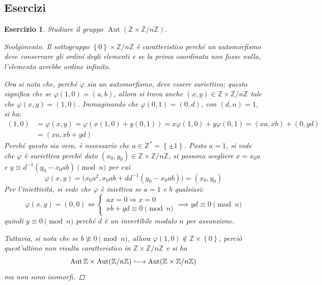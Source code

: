 \documentclass[12pt]{scrartcl}
\theoremstyle{style}
\newtheorem{esercizio}{Esercizio}[section]
\newenvironment{svolgimento}{\renewcommand\qedsymbol{$\blacksquare$}\begin{proof}[Svolgimento]}{\end{proof}}
\numberwithin{equation}{subsection}
\newcommand{\longhookrightarrow}{\lhook\joinrel\longrightarrow}
\begin{document}
\subsection{Esercizi}
\begin{esercizio}
Studiare il gruppo $\operatorname{Aut} ( \mathbb{Z}\times \mathbb{Z}/n\mathbb{Z})$.
\begin{svolgimento}
	Il sottogruppo $\left\{ 0 \right\} \times \mathbb{Z}/n\mathbb{Z}$ \`e caratteristico perch\'e un automorfismo deve conservare gli ordini degli elementi e se la prima coordinata non fosse nulla, l'elemento avrebbe ordine infinito.

	Ora si nota che, perch\'e $\varphi $ sia un automorfismo, deve essere suriettivo; questo significa che se $\varphi (1,0) = (a,b)$, allora si trova anche $(x,y) \in \mathbb{Z}\times \mathbb{Z}/n\mathbb{Z}$ tale che $\varphi (x,y) = (1,0)$. Immaginando che $\varphi (0,1) = (0,d)$, con $(d,n) = 1$, si ha:
	\[
		\begin{split}
			(1,0) &= \varphi (x,y) = \varphi (x (1,0) + y (0,1)) = x\varphi (1,0) + y \varphi (0,1) = (xa,xb) + (0,yd)\\
													       &= (xa, xb + yd)
		\end{split}
	\] 
	Perch\'e questo sia vero, \`e necessario che $a \in \mathbb{Z}^* = \left\{ \pm 1 \right\} $.
Posto $a = 1$, si vede che $\varphi $ \`e suriettiva perch\'e dato $(x_0,y_0) \in \mathbb{Z}\times \mathbb{Z}/n\mathbb{Z}$, si possono scegliere $x = x_0 a$ e $y \equiv d^{-1}(y_0 - x_0 ab)\pmod{n} $ per cui
\[
\varphi (x,y) = \big(x_0a^{2} ,x_0 ab +dd^{-1}(y_0-x_0ab)\big)=(x_0,y_0)
\] 
	Per l'iniettivit\`a, si vede che $\varphi $ \`e iniettiva se $a=1$ e $b$ qualsiasi:
	\[
	\varphi (x,y) = (0,0) \iff \begin{cases}
		ax = 0\Rightarrow x=0 \\
		xb + yd \equiv 0 \pmod{n} 
	\end{cases}\implies yd \equiv 0 \pmod{n}
	\] 
	quindi $y \equiv 0 \pmod{n} $ perch\'e $d$ \`e un invertibile modulo $n$ per assunzione.

	Tuttavia, si nota che se $b \not \equiv 0 \pmod{n} $, allora $\varphi (1,0)\not\in \mathbb{Z}\times \left\{ 0 \right\} $, perci\`o quest'ultimo non risulta caratteristico in $\mathbb{Z}\times \mathbb{Z}/n\mathbb{Z}$ e si ha 
	\[
	\operatorname{Aut} \mathbb{Z} \times \operatorname{Aut} (\mathbb{Z}/n\mathbb{Z}) \longhookrightarrow \operatorname{Aut} (\mathbb{Z}\times \mathbb{Z}/n\mathbb{Z})
	\] 
	ma non sono isomorfi.
\end{svolgimento}
\end{esercizio}
\end{document}
